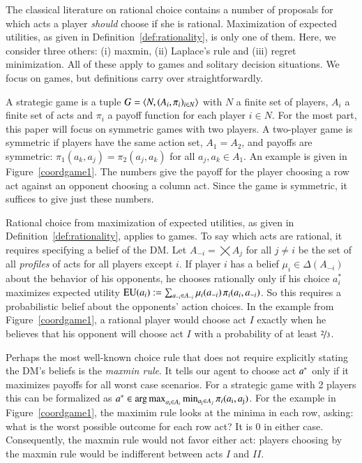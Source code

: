 \documentclass[fleqn,reqno,11pt]{article}
\begin{document}
The classical literature on rational choice contains a number of proposals for which acts a
player \emph{should} choose if she is rational. Maximization of expected utilities, as
given in Definition~\ref{def:rationality}, is only one of them. Here, we consider three others:
(i) maxmin, (ii) Laplace's rule and (iii) regret minimization. All of these apply to games and
solitary decision situations. We focus on games, but definitions carry over straightforwardly.

A strategic game is a tuple $ G=\left \langle  N, (A_i , \pi_i)_{i \in N} \right\rangle$ with $N$ a finite set of
players, $A_i$ a finite set of acts and $\pi_i$ a payoff function for each player $i \in N$.
For the most part, this paper will focus on symmetric games with two players. A two-player game
is symmetric if players have the same action set, $A_1 = A_2$, and payoffs are symmetric:
$\pi_1(a_k, a_j) = \pi_2(a_j, a_k)$ for all $a_j,a_k \in A_1$. An example is given in
Figure~\ref{coordgame1}. The numbers give the payoff for the player choosing a row act against
an opponent choosing a column act. Since the game is symmetric, it suffices to give just these
numbers.

Rational choice from maximization of expected utilities, as given in
Definition~\ref{def:rationality}, applies to games. To say which acts are rational, it requires
specifying a belief of the DM. Let $A_{-i} = \bigtimes A_j$ for all $j \neq i$ be the set of
all \emph{profiles} of acts for all players except $i$. If player $i$ has a belief
$\mu_i \in \Delta(A_{-i})$ about the behavior of his opponents, he chooses rationally only if
his choice $a^*_i$ maximizes expected utility
$\operatorname{EU}(a_i) := \sum_{a_{-i} \in A_{-i}} \mu_i(a_{-i}) \thinspace \pi_i(a_i, a_{-i})$. So
this requires a probabilistic belief about the opponents' action choices. In the example from
Figure~\ref{coordgame1}, a rational player would choose act $I$ exactly when he believes that
his opponent will choose act $I$ with a probability of at least $\nicefrac{2}{3}$.

Perhaps the most well-known choice rule that does not require explicitly stating the DM's
beliefs is the \emph{maxmin rule}. It tells our agent to choose act $a^*$ only if it
maximizes payoffs for all worst case scenarios. For a strategic game with 2 players this can be
formalized as
$a^* \in \operatorname*{arg\,max}_{a_{\text{i}} \in A_i} \min_{a_{\text{j}} \in A_j} \pi_i(a_{\text{i}},
a_{\text{j}})$.
For the example in Figure~\ref{coordgame1}, the maximim rule looks at the minima in each row,
asking: what is the worst possible outcome for each row act? It is $0$ in either
case. Consequently, the maxmin rule would not favor either act: players choosing by the
maxmin rule would be indifferent between acts $I$ and $II$.
\end{document}
